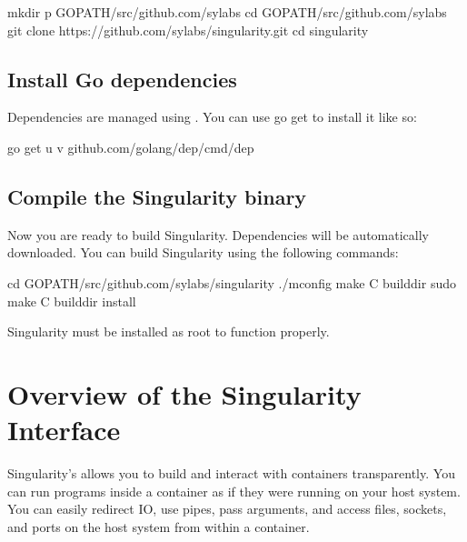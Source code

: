 \documentclass[letterpaper,10pt,english]{sphinxmanual}
\begin{document}
%
\begin{sphinxVerbatim}[commandchars=\\\{\}]
\PYGZdl{} mkdir \PYGZhy{}p \PYGZdl{}GOPATH/src/github.com/sylabs
\PYGZdl{} cd \PYGZdl{}GOPATH/src/github.com/sylabs
\PYGZdl{} git clone https://github.com/sylabs/singularity.git
\PYGZdl{} cd singularity
\end{sphinxVerbatim}


\subsection{Install Go dependencies}
\label{\detokenize{quick_start:install-go-dependencies}}
Dependencies are managed using . You
can use go get to install it like so:

%
\begin{sphinxVerbatim}[commandchars=\\\{\}]
\PYGZdl{} go get \PYGZhy{}u \PYGZhy{}v github.com/golang/dep/cmd/dep
\end{sphinxVerbatim}


\subsection{Compile the Singularity binary}
\label{\detokenize{quick_start:compile-the-singularity-binary}}
Now you are ready to build Singularity. Dependencies will be automatically
downloaded. You can build Singularity using the following commands:

%
\begin{sphinxVerbatim}[commandchars=\\\{\}]
\PYGZdl{} cd \PYGZdl{}GOPATH/src/github.com/sylabs/singularity
\PYGZdl{} ./mconfig
\PYGZdl{} make \PYGZhy{}C builddir
\PYGZdl{} sudo make \PYGZhy{}C builddir install
\end{sphinxVerbatim}

Singularity must be installed as root to function properly.


\section{Overview of the Singularity Interface}
\label{\detokenize{quick_start:overview-of-the-singularity-interface}}
Singularity’s  allows you to build
and interact with containers transparently. You can run programs inside a
container as if they were running on your host system. You can easily redirect
IO, use pipes, pass arguments, and access files, sockets, and ports on the host
system from within a container.
\end{document}
